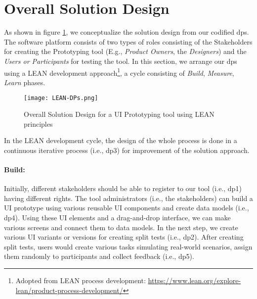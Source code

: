 
\clearpage
\section{Overall Solution Design}
\label{design:section:solutiondesign}
As shown in figure \ref{fig:design:lean}, we conceptualize the solution design from our codified \ac{dp}s.
The software platform consists of two types of roles consisting of the Stakeholders for creating the Prototyping tool (E.g., \textit{Product Owners}, the \textit{Designers}) and the \textit{Users or Participants} for testing the tool.
In this section, we arrange our \ac{dp}s using a LEAN development approach\footnote{Adopted from LEAN process development: \url{https://www.lean.org/explore-lean/product-process-development/}}, a cycle consisting of \textit{Build}, \textit{Measure}, \textit{Learn} phases.

\begin{figure}[htbp!]
  \centering    
  \texttt{[image: LEAN-DPs.png]}
  \caption[Solution Concept]{Overall Solution Design for a UI Prototyping tool using LEAN principles}
  \label{fig:design:lean}
\end{figure}

In the LEAN development cycle, the design of the whole process is done in a continuous iterative process (i.e., \ac{dp}3) for improvement of the solution approach.
\paragraph{Build:}
\label{design:paragraph:build}
Initially, different stakeholders should be able to register to our tool (i.e., \ac{dp}1) having different rights. 
The tool administrators (i.e., the stakeholders) can build a UI prototype using various reusable UI components and create data models (i.e., \ac{dp}4). Using these UI elements and a drag-and-drop interface, we can make various screens and connect them to data models.
In the next step, we create various UI variants or versions for creating split tests (i.e., \ac{dp}2).
After creating split tests, users would create various tasks simulating real-world scenarios, assign them randomly to participants and collect feedback (i.e., \ac{dp}5).
